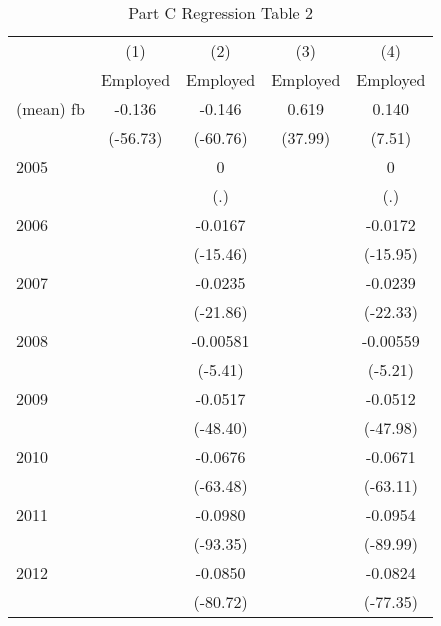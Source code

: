 \begin{table}[htbp]\centering
\caption{Part C Regression Table 2\label{tab1}}
\begin{tabular}{l*{4}{c}}
\hline\hline
                    &\multicolumn{1}{c}{(1)}&\multicolumn{1}{c}{(2)}&\multicolumn{1}{c}{(3)}&\multicolumn{1}{c}{(4)}\\
                    &\multicolumn{1}{c}{Employed}&\multicolumn{1}{c}{Employed}&\multicolumn{1}{c}{Employed}&\multicolumn{1}{c}{Employed}\\
\hline
(mean) fb           &      -0.136&      -0.146&       0.619&       0.140\\
                    &    (-56.73)&    (-60.76)&     (37.99)&      (7.51)\\
[1em]
2005                &            &           0&            &           0\\
                    &            &         (.)&            &         (.)\\
[1em]
2006                &            &     -0.0167&            &     -0.0172\\
                    &            &    (-15.46)&            &    (-15.95)\\
[1em]
2007                &            &     -0.0235&            &     -0.0239\\
                    &            &    (-21.86)&            &    (-22.33)\\
[1em]
2008                &            &    -0.00581&            &    -0.00559\\
                    &            &     (-5.41)&            &     (-5.21)\\
[1em]
2009                &            &     -0.0517&            &     -0.0512\\
                    &            &    (-48.40)&            &    (-47.98)\\
[1em]
2010                &            &     -0.0676&            &     -0.0671\\
                    &            &    (-63.48)&            &    (-63.11)\\
[1em]
2011                &            &     -0.0980&            &     -0.0954\\
                    &            &    (-93.35)&            &    (-89.99)\\
[1em]
2012                &            &     -0.0850&            &     -0.0824\\
                    &            &    (-80.72)&            &    (-77.35)\\

\end{tabular}
\end{table}
